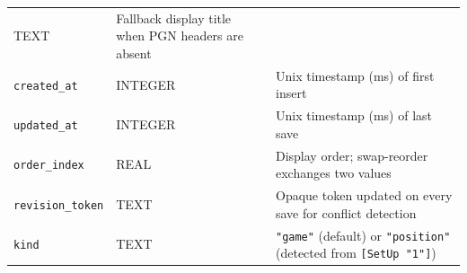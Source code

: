 \documentclass[]{article}
\begin{document}
\begin{longtable}[]{@{}lll@{}}
\begin{minipage}[t]{0.05\columnwidth}
TEXT\strut
\end{minipage} & \begin{minipage}[t]{0.05\columnwidth}\raggedright\strut
Fallback display title when PGN headers are absent\strut
\end{minipage}\tabularnewline
\begin{minipage}[t]{0.05\columnwidth}\raggedright\strut
\texttt{created\_at}\strut
\end{minipage} & \begin{minipage}[t]{0.05\columnwidth}\raggedright\strut
INTEGER\strut
\end{minipage} & \begin{minipage}[t]{0.05\columnwidth}\raggedright\strut
Unix timestamp (ms) of first insert\strut
\end{minipage}\tabularnewline
\begin{minipage}[t]{0.05\columnwidth}\raggedright\strut
\texttt{updated\_at}\strut
\end{minipage} & \begin{minipage}[t]{0.05\columnwidth}\raggedright\strut
INTEGER\strut
\end{minipage} & \begin{minipage}[t]{0.05\columnwidth}\raggedright\strut
Unix timestamp (ms) of last save\strut
\end{minipage}\tabularnewline
\begin{minipage}[t]{0.05\columnwidth}\raggedright\strut
\texttt{order\_index}\strut
\end{minipage} & \begin{minipage}[t]{0.05\columnwidth}\raggedright\strut
REAL\strut
\end{minipage} & \begin{minipage}[t]{0.05\columnwidth}\raggedright\strut
Display order; swap-reorder exchanges two values\strut
\end{minipage}\tabularnewline
\begin{minipage}[t]{0.05\columnwidth}\raggedright\strut
\texttt{revision\_token}\strut
\end{minipage} & \begin{minipage}[t]{0.05\columnwidth}\raggedright\strut
TEXT\strut
\end{minipage} & \begin{minipage}[t]{0.05\columnwidth}\raggedright\strut
Opaque token updated on every save for conflict detection\strut
\end{minipage}\tabularnewline
\begin{minipage}[t]{0.05\columnwidth}\raggedright\strut
\texttt{kind}\strut
\end{minipage} & \begin{minipage}[t]{0.05\columnwidth}\raggedright\strut
TEXT\strut
\end{minipage} & \begin{minipage}[t]{0.05\columnwidth}\raggedright\strut
\texttt{"game"} (default) or \texttt{"position"} (detected from
\texttt{{[}SetUp\ "1"{]}})\strut
\end{minipage}\tabularnewline
\bottomrule
\end{longtable}
\end{document}
